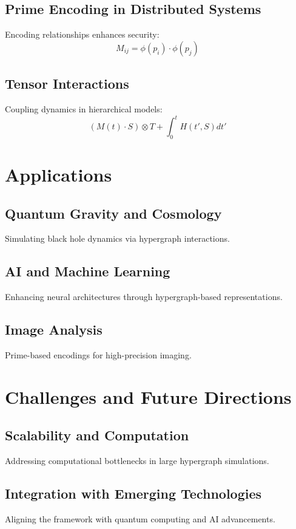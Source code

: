 \documentclass{article}
\theoremstyle{plain}
\begin{document}
\subsection{Prime Encoding in Distributed Systems}
Encoding relationships enhances security:
\begin{equation}
M_{ij} = \phi(p_i) \cdot \phi(p_j)
\end{equation}

\subsection{Tensor Interactions}
Coupling dynamics in hierarchical models:
\begin{equation}
(M(t) \cdot S) \otimes T + \int_0^t H(t', S) dt'
\end{equation}

\section{Applications}
\subsection{Quantum Gravity and Cosmology}
Simulating black hole dynamics via hypergraph interactions.

\subsection{AI and Machine Learning}
Enhancing neural architectures through hypergraph-based representations.

\subsection{Image Analysis}
Prime-based encodings for high-precision imaging.

\section{Challenges and Future Directions}
\subsection{Scalability and Computation}
Addressing computational bottlenecks in large hypergraph simulations.

\subsection{Integration with Emerging Technologies}
Aligning the framework with quantum computing and AI advancements.
\end{document}
